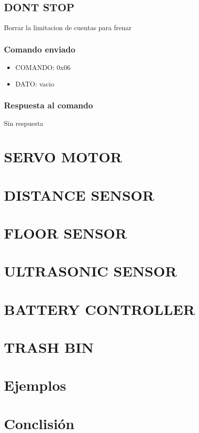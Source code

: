 \documentclass[a4paper,11pt]{article}
\begin{document}
\subsection{DONT STOP}
\label{dont_stop}

Borrar la limitacion de cuentas para frenar

\subsubsection*{Comando enviado}
\label{dont_stop_comando_enviado}

\begin{itemize}
	\item{COMANDO:} 0x06
	\item{DATO:} vacio
\end{itemize}

\subsubsection*{Respuesta al comando}
\label{dont_stop_respuesta}

Sin respuesta


\section{SERVO MOTOR}
\label{grupo_servo_motor}

\section{DISTANCE SENSOR} 
\label{grupo_distance_sensor}

\section{FLOOR SENSOR} 
\label{grupo_floor_sensor}

\section{ULTRASONIC SENSOR} 
\label{grupo_ultrasonic_sensor}

\section{BATTERY CONTROLLER} 
\label{grupo_battery_controller}

\section{TRASH BIN} 
\label{grupo_trash_bin}

\section{Ejemplos}
\label{ejemplos}

\section{Conclisi\'on}
\label{conclusion}
\end{document}
